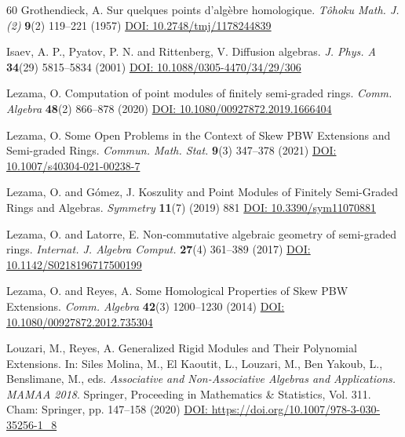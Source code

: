 \documentclass[reqno]{amsart}
\theoremstyle{definition}
\theoremstyle{remark}
\numberwithin{equation}{section}
\begin{document}
\begin{thebibliography}{60}
 Grothendieck, A. Sur quelques points d'alg{\`e}bre homologique. {\em T{\^o}hoku Math. J. (2)} {\bf 9}(2) 119--221 (1957) \href{https://projecteuclid.org/journals/tohoku-mathematical-journal/volume-9/issue-2/Sur-quelques-points-dalgÃ¨bre-homologique-I/10.2748/tmj/1178244839.full}{DOI: 10.2748/tmj/1178244839}


 Isaev, A. P., Pyatov, P. N. and Rittenberg, V. Diffusion algebras. {\em J. Phys. A} {\bf 34}(29) 5815--5834 (2001) \href{https://doi.org/10.1088/0305-4470/34/29/306}{DOI: 10.1088/0305-4470/34/29/306}

 Lezama, O. Computation of point modules of finitely semi-graded rings. {\em Comm. Algebra} {\bf 48}(2) 866--878 (2020) \href{https://doi.org/10.1080/00927872.2019.1666404}{DOI: 10.1080/00927872.2019.1666404}

 Lezama, O. Some Open Problems in the Context of Skew PBW Extensions and Semi-graded Rings. {\em Commun. Math. Stat.} {\bf 9}(3) 347--378 (2021) \href{10.1007/s40304-021-00238-7}{DOI: 10.1007/s40304-021-00238-7}

 Lezama, O. and G\'omez, J. Koszulity and Point Modules of Finitely Semi-Graded Rings and Algebras. {\em Symmetry} {\bf 11}(7) (2019) 881 \href{https://doi.org/10.3390/sym11070881}{DOI: 10.3390/sym11070881}

 Lezama, O. and Latorre, E. Non-commutative algebraic geometry of semi-graded rings. {\em Internat. J. Algebra Comput.} {\bf 27}(4) 361--389 (2017) \href{https://doi.org/10.1142/S0218196717500199}{DOI: 10.1142/S0218196717500199}

 Lezama, O. and Reyes, A. Some Homological Properties of Skew PBW Extensions. {\em Comm. Algebra} {\bf 42}(3) 1200--1230 (2014) \href{https://doi.org/10.1080/00927872.2012.735304}{DOI: 10.1080/00927872.2012.735304}

 Louzari, M., Reyes, A. Generalized {R}igid {M}odules and {T}heir {P}olynomial {E}xtensions. In: Siles Molina, M., El Kaoutit, L., Louzari, M., Ben Yakoub, L., Benslimane, M., eds. {\em Associative and Non-Associative Algebras and Applications. MAMAA 2018}. Springer, Proceeding in Mathematics \& Statistics, Vol. 311. Cham: Springer, pp. 147--158 (2020) \href{https://doi.org/10.1007/978-3-030-35256-1_8}{DOI: https://doi.org/10.1007/978-3-030-35256-1\_8}


\end{thebibliography}
\end{document}
